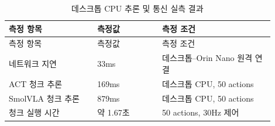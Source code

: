 \documentclass[titlepage]{pnureport}
\begin{document}
\begin{longtable}{p{0.30\linewidth}p{0.22\linewidth}p{0.38\linewidth}}
\caption{데스크톱 CPU 추론 및 통신 실측 결과}\label{tab:inference-time}\\
\toprule
측정 항목 & 측정값 & 측정 조건 \\
\midrule
\endfirsthead
\toprule
측정 항목 & 측정값 & 측정 조건 \\
\midrule
\endhead
네트워크 지연 & 33ms & 데스크톱--Orin Nano 원격 연결 \\
ACT 청크 추론 & 169ms & 데스크톱 CPU, 50 actions \\
SmolVLA 청크 추론 & 879ms & 데스크톱 CPU, 50 actions \\
청크 실행 시간 & 약 1.67초 & 50 actions, 30Hz 제어 \\
\bottomrule
\end{longtable}
\end{document}
